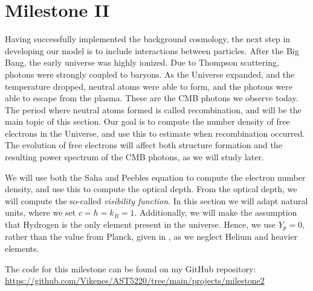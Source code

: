 \section{Milestone II}\label{M2}
Having successfully implemented the background cosmology, the next step in 
developing our model is to include interactions between particles. After the Big Bang, the early universe was highly ionized. Due to Thompson scattering, photons were strongly coupled to baryons. As the Universe expanded, and the temperature dropped, neutral atoms were able to form, and the photons were able to escape from the plasma. These are the CMB photons we observe today. The period where neutral atoms formed is called recombination, and will be the main topic of this section. Our goal is to compute the number density of free electrons in the Universe, and use this to estimate when recombination occurred. The evolution of free electrons will affect both structure formation and the resulting power spectrum of the CMB photons, as we will study later.

We will use both the Saha and Peebles equation to compute the electron number density, and use this to compute the optical depth. From the optical depth, we will compute the so-called \textit{visibility function}. In this section we will adapt natural units, where we set $c=\hbar=k_B=1$. Additionally, we will make the assumption that Hydrogen is the only element present in the universe. Hence, we use $Y_p=0$, rather than the value from Planck, given in 
, as we neglect Helium and heavier elements. \cite{Dodelson}


The code for this milestone can be found on my GitHub repository: \url{https://github.com/Vikenes/AST5220/tree/main/projects/milestone2}





 